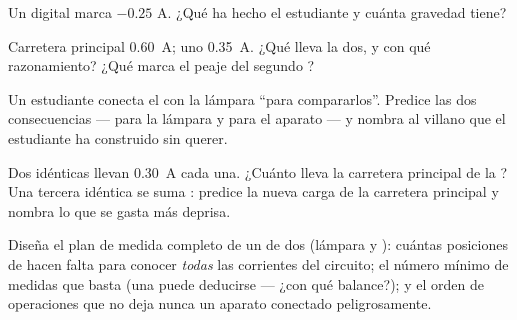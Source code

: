\begin{exercise}[$\star$]\label{exo:g8:intensity-ammeter:8}
Un  digital marca $-0.25$ \unit{A}. ¿Qué ha hecho el
estudiante y cuánta gravedad tiene?
\end{exercise}

\begin{exercise}[$\star\star$]\label{exo:g8:intensity-ammeter:9}
Carretera principal \qty{0.60}{A};  uno \qty{0.35}{A}. ¿Qué
lleva la  dos, y con qué razonamiento? ¿Qué marca el peaje
del segundo ?
\end{exercise}

\begin{exercise}[$\star\star$]\label{exo:g8:intensity-ammeter:10}
Un estudiante conecta el  \emph{} con
la lámpara ``para compararlos''. Predice las dos consecuencias --- para
la lámpara y para el aparato --- y nombra al villano que el estudiante
ha construido sin querer.
\end{exercise}

\begin{exercise}[$\star\star$]\label{exo:g8:intensity-ammeter:11}
Dos  idénticas  llevan \qty{0.30}{A} cada
una. ¿Cuánto lleva la carretera principal de la ? Una tercera
 idéntica se suma : predice la nueva carga
de la carretera principal y nombra lo que se gasta más deprisa.
\end{exercise}

\begin{exercise}[$\star\star\star$]\label{exo:g8:intensity-ammeter:12}
Diseña el plan de medida completo de un  de
dos  (lámpara y ): cuántas posiciones de
 hacen falta para conocer \emph{todas} las corrientes
del circuito; el número mínimo de medidas que basta (una puede
deducirse --- ¿con qué balance?); y el orden de operaciones que no deja
nunca un aparato conectado peligrosamente.
\end{exercise}

